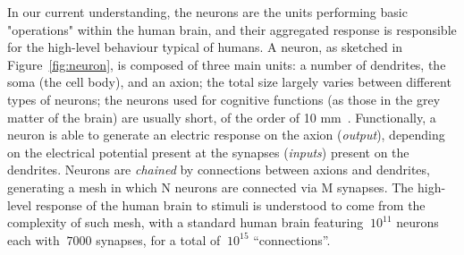  In our current understanding, the neurons are the units performing basic "operations" within the human brain, and their aggregated response is responsible for the high-level behaviour typical of humans.
 A neuron, as sketched in Figure~\ref{fig:neuron}, is composed of three main units: a number of dendrites, the soma (the cell body), and an axion; the total size largely varies between different types of neurons; the neurons used for cognitive functions (as those in the grey matter of the brain) are usually short, of the order of 10 mm~\cite{neuronlength}.
Functionally, a neuron is able to generate an electric response on the axion (\emph{output}), depending on the electrical potential present at the synapses (\emph{inputs}) present on the dendrites. Neurons are \emph{chained} by connections between axions and dendrites, generating a mesh in which N neurons are connected via M synapses.
 The high-level response of the human brain to stimuli is understood to come from the complexity of such mesh, with a standard human brain featuring $~10^{11}$ neurons each with $~7000$ synapses, for a total of $~10^{15}$ ``connections''.

